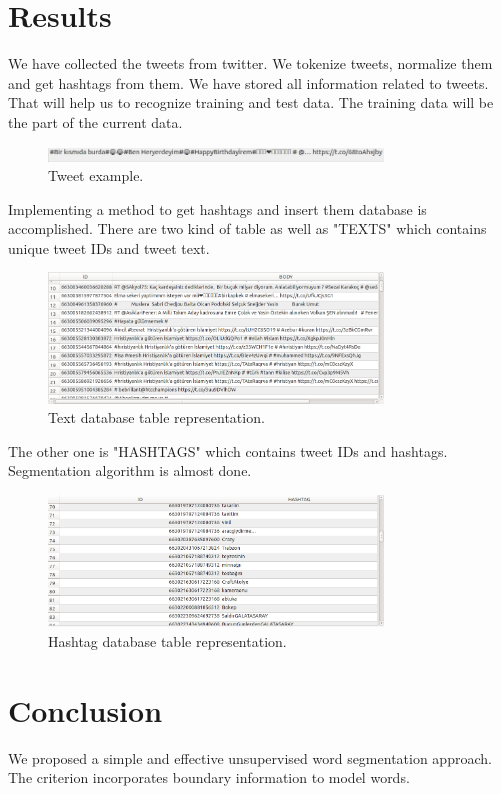 \documentclass[12pt]{comjnl}
\begin{document}
\section{Results}
We have collected the tweets from twitter. We tokenize tweets, normalize them and get 
hashtags from them. We have stored all information related to tweets. That will help us to recognize training and test data. The training data will be the part of the current data.

\begin{figure}[htbp]
\centering
\includegraphics[width=3.5in]{tweet.png}
\caption{Tweet example.}\label{fig:Tweet}
\end{figure}

Implementing a method to get hashtags and insert them database is 
accomplished. There are two kind of table as well as "TEXTS" which contains unique tweet IDs
and tweet text.

\begin{figure}[htbp]
\centering
\includegraphics[width=3.5in]{text.png}
\caption{Text database table representation.}\label{fig:Tweet}
\end{figure}

The other one is "HASHTAGS" which contains tweet IDs and hashtags. Segmentation algorithm
is almost done.

\begin{figure}[htbp]
\centering
\includegraphics[width=3.5in]{hashtag.png}
\caption{Hashtag database table representation.}\label{fig:Hashtag}
\end{figure}

\section{Conclusion}
We proposed a simple and effective unsupervised
word segmentation approach. The criterion incorporates
boundary information to model words.
\end{document}
